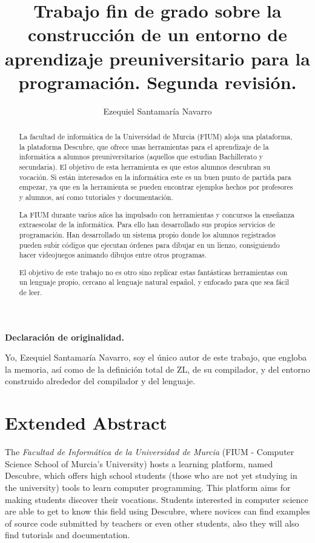 \documentclass{report}
\author{Ezequiel Santamaría Navarro}
\title{Trabajo fin de grado sobre la construcción de un entorno de aprendizaje preuniversitario para la programación. Segunda revisión.}
\begin{document}
	
	\maketitle
	
	\begin{center}
		\textbf{Declaración de originalidad.}
		
		\vspace{50px}
		
		Yo, Ezequiel Santamaría Navarro, soy el único autor de este trabajo, que engloba la memoria, así como de la definición total de ZL, de su compilador, y del entorno construido alrededor del compilador y del lenguaje. 
	\end{center}
	
	\tableofcontents
	\listoffigures
		
		
	\begin{abstract}
		La facultad de informática de la Universidad de Murcia (FIUM) aloja una plataforma, la plataforma Descubre, que ofrece unas herramientas para el aprendizaje de la informática a alumnos preuniversitarios (aquellos que estudian Bachillerato y secundaria). El objetivo de esta herramienta es que estos alumnos descubran su vocación. Si están interesados en la informática este es un buen punto de partida para empezar, ya que en la herramienta se pueden encontrar ejemplos hechos por profesores y alumnos, así como tutoriales y documentación. 
		
		La FIUM durante varios años ha impulsado con herramientas y concursos la enseñanza extraescolar de la informática. Para ello han desarrollado sus propios servicios de programación. Han desarrollado un sistema propio donde los alumnos registrados pueden subir códigos que ejecutan órdenes para dibujar en un lienzo, consiguiendo hacer videojuegos animando dibujos entre otros programas.
		
		El objetivo de este trabajo no es otro sino replicar estas fantásticas herramientas con un lenguaje propio, cercano al lenguaje natural español, y enfocado para que sea fácil de leer. 
	\end{abstract}
	
	\chapter{Extended Abstract}
	
	The \textit{Facultad de Informática de la Universidad de Murcia} (FIUM - Computer Science School of Murcia's University) hosts a learning platform, named Descubre, which offers high school students (those who are not yet studying in the university) tools to learn computer programming. This platform aims for making students discover their vocations. Students interested in computer science are able to get to know this field using Descubre, where novices can find examples of source code submitted by teachers or even other students, also they will also find tutorials and documentation. 
	
\end{document}
